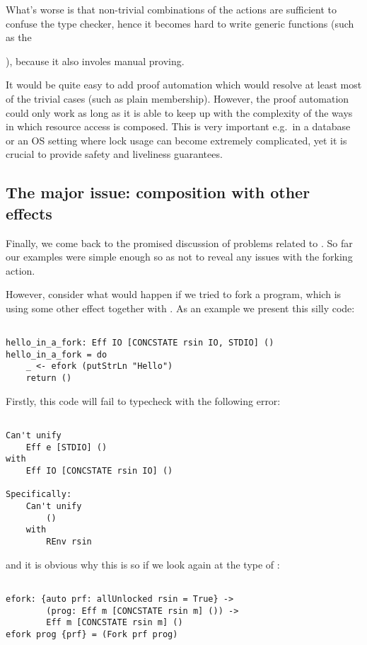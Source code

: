 What's worse is that non-trivial combinations of the  actions
are sufficient to confuse the type checker, hence it becomes hard to write
generic functions (such as the {), because it also
involes manual proving.

It would be quite easy to add proof automation which would resolve at least
most of the trivial cases (such as plain membership). However, the proof
automation could only work as long as it is able to keep up with the complexity
of the ways in which resource access is composed. This is very important
e.g.~in a database or an OS setting where lock usage can become extremely
complicated, yet it is crucial to provide safety and liveliness guarantees.

\subsection{The major issue: composition with other effects}

Finally, we come back to the promised discussion of problems related to
. So far our examples were simple enough so as not to reveal any
issues with the forking action.

However, consider what would happen if we tried to fork a program, which is
using some other effect together with . As an example we
present this silly code:

\begin{BVerbatim}

hello_in_a_fork: Eff IO [CONCSTATE rsin IO, STDIO] ()
hello_in_a_fork = do
    _ <- efork (putStrLn "Hello")
    return ()

\end{BVerbatim}

Firstly, this code will fail to typecheck with the following error:

\begin{BVerbatim}

Can't unify
    Eff e [STDIO] ()
with
    Eff IO [CONCSTATE rsin IO] ()

Specifically:
    Can't unify
        ()
    with
        REnv rsin

\end{BVerbatim}

and it is obvious why this is so if we look again at the type of :

\begin{BVerbatim}

efork: {auto prf: allUnlocked rsin = True} ->
        (prog: Eff m [CONCSTATE rsin m] ()) ->
        Eff m [CONCSTATE rsin m] ()
efork prog {prf} = (Fork prf prog)


\end{BVerbatim}}
